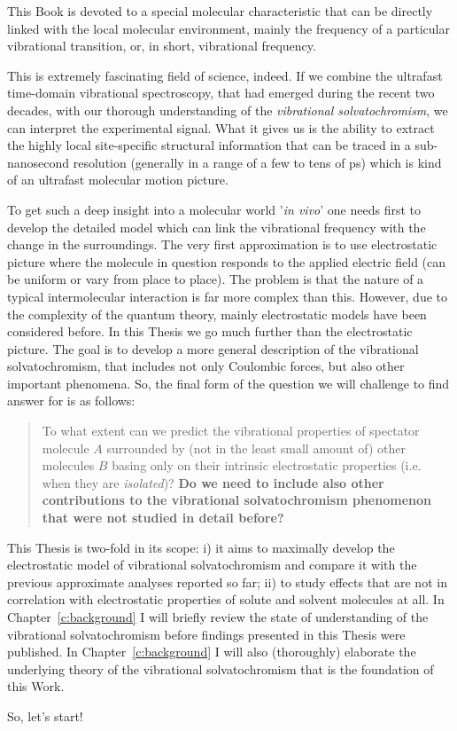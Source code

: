 \documentclass[a4paper,titlepage,twoside,fleqn,12pt]{book}
\begin{document}
\begin{refsection}
This Book is devoted to a special molecular characteristic 
that can be directly linked with the local molecular environment, mainly
the frequency of a particular vibrational transition, or, in short, 
vibrational frequency. 

This is extremely fascinating field of science, indeed. If we combine the
ultrafast time\hyp{}domain vibrational spectroscopy, that had emerged during the recent
two decades\citep{Book-Cho.TwoDimensionalOpticalSpectroscopy.2009}, 
with our thorough understanding of the \emph{vibrational solvatochromism},
we can interpret the experimental signal. What it gives us is the 
ability to extract the highly local site\hyp{}specific structural information
that can be traced in a sub-nanosecond resolution (generally in a range of
a few to tens of ps) which is kind of an ultrafast molecular motion picture.

To get such a deep insight into a molecular world '\emph{in vivo}' one needs
first to develop the detailed model which can link the vibrational frequency
with the change in the surroundings. The very first approximation is to use
electrostatic picture where the molecule in question responds to the applied
electric field (can be uniform or vary from place to place). The problem is that
the nature of a typical intermolecular interaction is far more complex than this. However, 
due to the complexity of the quantum theory, mainly electrostatic models
have been considered before. In this Thesis we go much further than the
electrostatic picture. The goal is to develop 
a more general description of the vibrational solvatochromism, that includes
not only Coulombic forces, but also other important phenomena. 
So, the final form of the 
question we will challenge to find answer for is as follows:
%
\begin{quote}
To what extent can we predict the vibrational properties of spectator molecule $A$ 
surrounded by (not in the least small amount of) other molecules $B$
basing only on their intrinsic electrostatic properties 
(i.e. when they are \emph{isolated})? \textbf{Do we need to include also other
contributions to the vibrational solvatochromism phenomenon that were not studied
in detail before?}
\end{quote}
%

This Thesis is two\hyp{}fold in its scope: i) it aims to maximally develop
the electrostatic model of vibrational solvatochromism and compare it
with the previous approximate analyses reported so far; ii) to
study effects that are not in correlation with electrostatic properties
of solute and solvent molecules at all. In Chapter~\ref{c:background} I will 
briefly review the state of understanding of the vibrational solvatochromism
before findings presented in this Thesis were published. In Chapter~\ref{c:background}
I will also (thoroughly) elaborate the underlying theory of the vibrational
solvatochromism that is the foundation of this Work. 

So, let's start!

\printbibliography[heading=subbibintoc,title={References}]
\end{refsection}
\end{document}
